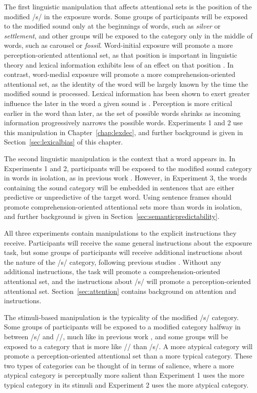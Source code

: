 The first linguistic manipulation that affects attentional sets is the position of the modified /s/ in the exposure words.  
Some groups of participants will be exposed to the modified sound only at the beginnings of words, such as \emph{silver} or \emph{settlement}, and other groups will be exposed to the category only in the middle of words, such as {carousel} or \emph{fossil}.
Word-initial exposure will promote a more perception-oriented attentional set, as that position is important in linguistic theory \citep{Beckman1998} and lexical information exhibits less of an effect on that position \citep{Pitt2006}.
In contrast, word-medial exposure will promote a more comprehension-oriented attentional set, as the identity of the word will be largely known by the time the modified sound is processed.  
Lexical information has been shown to exert greater influence the later in the word a given sound is \citep{Pitt2006}.
Perception is more critical earlier in the word than later, as the set of possible words shrinks as incoming information progressively narrows the possible words.
Experiments 1 and 2 use this manipulation in Chapter~\ref{chap:lexdec}, and further background is given in Section~\ref{sec:lexicalbias} of this chapter.

The second linguistic manipulation is the context that a word appears in.  
In Experiments 1 and 2, participants will be exposed to the modified sound category in words in isolation, as in previous work \citep{Norris2003}.  
However, in Experiment 3, the words containing the sound category will be embedded in sentences that are either predictive or unpredictive of the target word.
Using sentence frames should promote comprehension-oriented attentional sets more than words in isolation, and further background is given in Section~\ref{sec:semanticpredictability}.

All three experiments contain manipulations to the explicit instructions they receive.
Participants will receive the same general instructions about the exposure task, but some groups of participants will receive additional instructions about the nature of the /s/ category, following previous studies \citep{Pitt2012}.
Without any additional instructions, the task will promote a comprehension-oriented attentional set, and the instructions about /s/ will promote a perception-oriented attentional set.
Section~\ref{sec:attention} contains background on attention and instructions.

The stimuli-based manipulation is the typicality of the modified /s/ category.
Some groups of participants will be exposed to a modified category halfway in between /s/ and /\textesh/, much like in previous work \citep{Norris2003}, and some groups will be exposed to a category that is more like /\textesh/ than /s/. 
A more atypical category will promote a perception-oriented attentional set than a more typical category.
These two types of categories can be thought of in terms of salience, where a more atypical category is perceptually more salient than 
Experiment 1 uses the more typical category in its stimuli and Experiment 2 uses the more atypical category.

